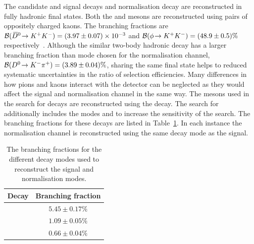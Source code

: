 The candidate \decay{\Bp}{\Dsp\Kp\Km} and \decay{\Bp}{\Dsp\phiz} signal decays and \decay{\Bp}{\Dsp\Dzb} normalisation decay are reconstructed in fully hadronic final states. Both the \Dzb and \phiz mesons are reconstructed using pairs of oppositely charged kaons. The branching fractions are ${\mathcal{B}}({{\kern 0.2em\overline{\kern -0.2em D}{}}{}^0}\!\rightarrow {\ensuremath{{K}^+}}{\ensuremath{{K}^-}})= (3.97 \pm 0.07)\times 10^{-3}$ and ${\mathcal{B}}(\phi\!\rightarrow {\ensuremath{{K}^+}}{\ensuremath{{K}^-}})= (48.9 \pm 0.5)\%$ respectively~\cite{PDG2016}. Although the similar two-body hadronic decay \decay{\Dz}{\Km\pip} has a larger branching fraction than mode chosen for the normalisation channel, ${\mathcal{B}}({{D}^0}\!\rightarrow {\ensuremath{{K}^-}}{\ensuremath{{\pi}^+}})= (3.89 \pm 0.04)\%$, sharing the same final state helps to reduced systematic uncertainties in the ratio of selection efficiencies. Many differences in how pions and kaons interact with the detector can be neglected as they would affect the signal and normalisation channel in the same way.
The \Dsp mesons used in the search for \decay{\Bp}{\Dsp\Kp\Km} decays are reconstructed using the \decay{\Dsp}{\Kp\Km\pip} decay. The search for \decay{\Bp}{\Dsp\phiz} additionally includes the modes \decay{\Dsp}{\pip\pim\pip} and \decay{\Dsp}{\Kp\pim\pip} to increase the sensitivity of the search. The branching fractions for these decays are listed in Table~\ref{tab:dsbranchingfractions}. In each instance the normalisation channel is reconstructed using the same \Dsp decay mode as the signal.  


\begin{table}[h]
   \begin{center}
      \begin{tabular}{lc}
         \hline
         Decay                         &  Branching fraction \\
         \hline 
         \decay{\Dsp}{\Kp\Km\pip}      & $5.45 \pm 0.17 \%$ \\
         \decay{\Dsp}{\pip\pim\pip}    & $1.09 \pm 0.05 \%$ \\
         \decay{\Dsp}{\Kp\pim\pip}     & $0.66 \pm 0.04 \%$ \\
         \hline
      \end{tabular}
   \end{center}
   \caption{The branching fractions for the different \Dsp decay modes used to reconstruct the signal and normalisation modes.}
   \label{tab:dsbranchingfractions}
\end{table}



